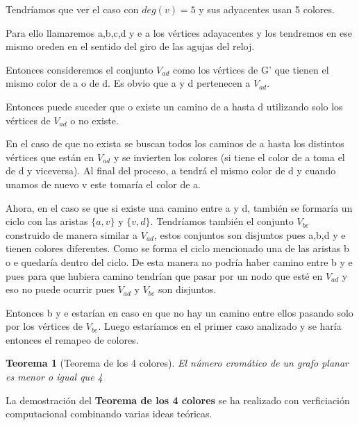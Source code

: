 \documentclass[a4paper,1pt]{report}
\newtheorem*{teo}{Teorema}
\begin{document}
Tendríamos que ver el caso con $deg(v)=5$ y sus adyacentes usan 5 colores.

Para ello llamaremos a,b,c,d y e a los vértices adayacentes y los tendremos en ese mismo oreden en el sentido del giro de las agujas del reloj.

Entonces consideremos el conjunto $V_{ad}$ como los vértices de G' que tienen el mismo color de a o de d. Es obvio que a y d pertenecen a $V_{ad}$.

Entonces puede suceder que o existe un camino de a hasta d utilizando solo los vértices de $V_{ad}$ o no existe.

En el caso de que no exista se buscan todos los caminos de a hasta los distintos vértices que  están en $V_{ad}$ y se invierten los colores (si tiene el color de a toma el de d y viceversa). Al final del proceso, a tendrá el mismo color de d y cuando unamos de nuevo v este tomaría el color de a.

Ahora, en el caso se que si existe una camino entre a y d, también se formaría un ciclo con las aristas $\{a,v\}$ y $\{v,d\}$. Tendríamos también el conjunto $V_{be}$ construido de manera similar a $V_{ad}$, estos conjuntos son disjuntos pues a,b,d y e tienen colores diferentes. Como se forma el ciclo mencionado una de las aristas b o e quedaría dentro del ciclo. De esta manera no podría haber camino entre b y e pues para que hubiera camino tendrían que pasar por un nodo que esté en $V_{ad}$ y eso no puede ocurrir pues $V_{ad}$ y $V_{be}$ son disjuntos.

Entonces b y e estarían en caso en que no hay un camino entre ellos pasando solo por los vértices de $V_{be}$. Luego estaríamos en el primer caso analizado y se haría entonces el remapeo de colores.


\begin{teo}[Teorema de los 4 colores] El número cromático de un grafo planar es menor o igual que 4 
\end{teo}

La demostración del \textbf{Teorema de los 4 colores} se ha realizado con verficiación computacional combinando varias ideas teóricas.
\end{document}
